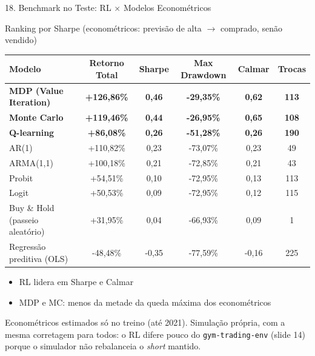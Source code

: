 \documentclass[aspectratio=169,10pt,t]{beamer}
\begin{document}
\begin{frame}{18. Benchmark no Teste: RL $\times$ Modelos Econométricos}

  \begin{block}{Ranking por Sharpe \quad (econométricos: previsão de alta $\to$ comprado, senão vendido)}
    \centering\footnotesize
    \setlength{\tabcolsep}{7pt}
    \renewcommand{\arraystretch}{1.05}
    \begin{tabular}{l ccccc}
      \toprule
      \textbf{Modelo} & \textbf{Retorno Total} & \textbf{Sharpe} & \textbf{Max Drawdown} & \textbf{Calmar} & \textbf{Trocas} \\
      \midrule
      \textbf{MDP (Value Iteration)}   & \textbf{+126,86\%} & \textbf{0,46} & \textbf{-29,35\%} & \textbf{0,62} & \textbf{113} \\
      \textbf{Monte Carlo}             & \textbf{+119,46\%} & \textbf{0,44} & \textbf{-26,95\%} & \textbf{0,65} & \textbf{108} \\
      \textbf{Q-learning}              & \textbf{+86,08\%}  & \textbf{0,26} & \textbf{-51,28\%} & \textbf{0,26} & \textbf{190} \\
      \midrule
      AR(1)                            & +110,82\% & 0,23  & -73,07\% & 0,23  & 49  \\
      ARMA(1,1)                        & +100,18\% & 0,21  & -72,85\% & 0,21  & 43  \\
      Probit                           & +54,51\%  & 0,10  & -72,95\% & 0,13  & 113 \\
      Logit                            & +50,53\%  & 0,09  & -72,95\% & 0,12  & 115 \\
      Buy \& Hold (passeio aleatório)  & +31,95\%  & 0,04  & -66,93\% & 0,09  & 1   \\
      Regressão preditiva (OLS)        & -48,48\%  & -0,35 & -77,59\% & -0,16 & 225 \\
      \bottomrule
    \end{tabular}
  \end{block}

  \small
  \begin{itemize}\setlength{\itemsep}{2pt}
    \item RL lidera em Sharpe e Calmar
    \item MDP e MC: menos da metade da queda máxima dos econométricos
  \end{itemize}

  \vfill
  {\scriptsize\color{SlateGray} Econométricos estimados só no treino (até 2021). Simulação própria, com a mesma corretagem para todos: o RL difere pouco do \texttt{gym-trading-env} (slide 14) porque o simulador não rebalanceia o \textit{short} mantido.\par}

\end{frame}
\end{document}
